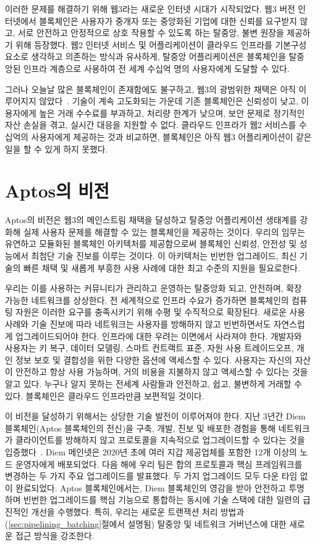 \documentclass{article}
\begin{document}
이러한 문제를 해결하기 위해 웹3라는 새로운 인터넷 시대가 시작되었다. 웹3 버전 인터넷에서 블록체인은 사용자가 중개자 또는 중앙화된 기업에 대한 신뢰를 요구받지 않고, 서로 안전하고 안정적으로 상호 작용할 수 있도록 하는 탈중앙, 불변 원장을 제공하기 위해 등장했다. 웹2 인터넷 서비스 및 어플리케이션이 클라우드 인프라를 기본구성요소로 생각하고 의존하는 방식과 유사하게, 탈중앙 어플리케이션은 블록체인을 탈중앙된 인프라 계층으로 사용하여 전 세계 수십억 명의 사용자에게 도달할 수 있다.

그러나 오늘날 많은 블록체인이 존재함에도 불구하고, 웹3의 광범위한 채택은 아직 이루어지지 않았다~\cite{a16_state}. 기술이 계속 고도화되는 가운데 기존 블록체인은 신뢰성이 낮고, 이용자에게 높은 거래 수수료를 부과하고, 처리량 한계가 낮으며, 보안 문제로 정기적인 자산 손실을 겪고, 실시간 대응을 지원할 수 없다. 클라우드 인프라가 웹2 서비스를 수십억의 사용자에게 제공하는 것과 비교하면, 블록체인은 아직 웹3 어플리케이션이 같은 일을 할 수 있게 하지 못했다.

\section{Aptos의 비전}
\label{sec:aptos_vision}

Aptos의 비전은 웹3의 메인스트림 채택을 달성하고 탈중앙 어플리케이션 생태계를 강화해 실제 사용자 문제를 해결할 수 있는 블록체인을 제공하는 것이다. 우리의 임무는 유연하고 모듈화된 블록체인 아키텍처를 제공함으로써 블록체인 신뢰성, 안전성 및 성능에서 최첨단 기술 진보를 이루는 것이다. 이 아키텍처는 빈번한 업그레이드, 최신 기술의 빠른 채택 및 새롭게 부흥한 사용 사례에 대한 최고 수준의 지원을 필요로한다.

우리는 이를 사용하는 커뮤니티가 관리하고 운영하는 탈중앙화 되고, 안전하며, 확장 가능한 네트워크를 상상한다. 전 세계적으로 인프라 수요가 증가하면 블록체인의 컴퓨팅 자원은 이러한 요구를 충족시키기 위해 수평 및 수직적으로 확장된다. 새로운 사용 사례와 기술 진보에 따라 네트워크는 사용자를 방해하지 않고 빈번하면서도 자연스럽게 업그레이드되어야 한다. 인프라에 대한 우려는 이면에서 사라져야 한다. 개발자와 사용자는 키 복구, 데이터 모델링, 스마트 컨트랙트 표준, 자원 사용 트레이드오프, 개인 정보 보호 및 결합성을 위한 다양한 옵션에 액세스할 수 있다. 사용자는 자신의 자산이 안전하고 항상 사용 가능하며, 거의 비용을 지불하지 않고 액세스할 수 있다는 것을 알고 있다. 누구나 알지 못하는 전세계 사람들과 안전하고, 쉽고, 불변하게 거래할 수 있다. 블록체인은 클라우드 인프라만큼 보편적일 것이다.

이 비전을 달성하기 위해서는 상당한 기술 발전이 이루어져야 한다. 지난 3년간 Diem 블록체인(Aptos 블록체인의 전신)을 구축, 개발, 진보 및 배포한 경험을 통해 네트워크가 클라이언트를 방해하지 않고 프로토콜을 지속적으로 업그레이드할 수 있다는 것을 입증했다~\cite{diem_blockchain}. Diem 메인넷은 2020년 초에 여러 지갑 제공업체를 포함한 12개 이상의 노드 운영자에게 배포되었다. 다음 해에 우리 팀은 합의 프로토콜과 핵심 프레임워크를 변경하는 두 가지 주요 업그레이드를 발표했다. 두 가지 업그레이드 모두 다운 타임 없이 완료되었다. Aptos 블록체인에서는, Diem 블록체인의 영감을 받아 안전하고 투명하며 빈번한 업그레이드를 핵심 기능으로 통합하는 동시에 기술 스택에 대한 일련의 급진적인 개선을 수행했다. 특히, 우리는 새로운 트랜잭션 처리 방법과 (\ref{sec:pipelining_batching}절에서 설명됨) 탈중앙 및 네트워크 거버넌스에 대한 새로운 접근 방식을 강조한다.
\end{document}
